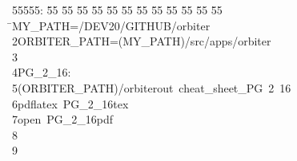 %
%
\begin{tabbing}
55555: \= 55 \= 55 \= 55 \= 55 \= 55 \= 55 \= 55 \= 55 \= 55 \= 55 \= 55 \= 55 \= \>MY\_PATH=/DEV20/GITHUB/orbiter\\[0pt]
2\>ORBITER\_PATH=(MY\_PATH)/src/apps/orbiter\\[0pt]
3\>\\[0pt]
4\>PG\_2\_16:\\[0pt]
5\>\>(ORBITER\_PATH)/orbiterout\ cheat\_sheet\_PG\ 2\ 16\\[0pt]
6\>\>pdflatex\ PG\_2\_16tex\ \\[0pt]
7\>\>open\ PG\_2\_16pdf\\[0pt]
8\>\\[0pt]
9\>\end{tabbing}
